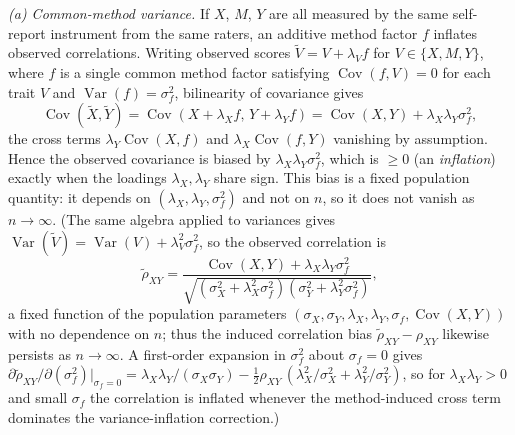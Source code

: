 \documentclass{amsart}
\theoremstyle{definition}
\begin{document}
\emph{(a) Common-method variance.} If $X$, $M$, $Y$ are all measured by the
same self-report instrument from the same raters, an additive method factor
$f$ inflates observed correlations. Writing observed scores
$\tilde V = V + \lambda_V f$ for $V\in\{X,M,Y\}$, where $f$ is a single
common method factor satisfying $\operatorname{Cov}(f,V)=0$ for each trait
$V$ and $\operatorname{Var}(f)=\sigma_f^2$, bilinearity of covariance gives
\[
  \operatorname{Cov}(\tilde X,\tilde Y)
   = \operatorname{Cov}(X+\lambda_X f,\,Y+\lambda_Y f)
   = \operatorname{Cov}(X,Y) + \lambda_X\lambda_Y\sigma_f^2,
\]
the cross terms $\lambda_Y\operatorname{Cov}(X,f)$ and
$\lambda_X\operatorname{Cov}(f,Y)$ vanishing by assumption. Hence the
observed covariance is biased by $\lambda_X\lambda_Y\sigma_f^2$, which is
$\ge0$ (an \emph{inflation}) exactly when the loadings $\lambda_X,\lambda_Y$
share sign. This bias is a fixed population quantity: it depends on
$(\lambda_X,\lambda_Y,\sigma_f^2)$ and not on $n$, so it does not vanish as
$n\to\infty$. (The same algebra applied to variances gives
$\operatorname{Var}(\tilde V)=\operatorname{Var}(V)+\lambda_V^2\sigma_f^2$,
so the observed correlation is
\[
  \tilde\rho_{XY}
   =\frac{\operatorname{Cov}(X,Y)+\lambda_X\lambda_Y\sigma_f^2}
        {\sqrt{(\sigma_X^2+\lambda_X^2\sigma_f^2)(\sigma_Y^2+\lambda_Y^2\sigma_f^2)}},
\]
a fixed function of the population parameters
$(\sigma_X,\sigma_Y,\lambda_X,\lambda_Y,\sigma_f,\operatorname{Cov}(X,Y))$
with no dependence on $n$; thus the induced correlation bias
$\tilde\rho_{XY}-\rho_{XY}$ likewise persists as $n\to\infty$. A first-order
expansion in $\sigma_f^2$ about $\sigma_f=0$ gives
$\partial\tilde\rho_{XY}/\partial(\sigma_f^2)\big|_{\sigma_f=0}
=\lambda_X\lambda_Y/(\sigma_X\sigma_Y)
-\tfrac12\rho_{XY}\,(\lambda_X^2/\sigma_X^2+\lambda_Y^2/\sigma_Y^2)$,
so for $\lambda_X\lambda_Y>0$ and small $\sigma_f$ the correlation is
inflated whenever the method-induced cross term dominates the
variance-inflation correction.)
\end{document}
